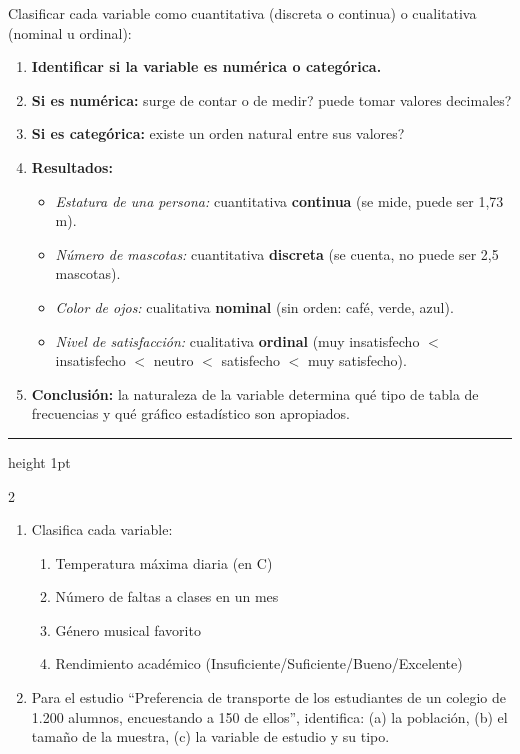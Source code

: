 \documentclass[11pt, letterpaper]{article}
\newcommand{\subbloque}[1]{%
  \vspace{14pt}
  \noindent{\large\bfseries\color{zenitnavy} #1}\par
  \vspace{4pt}\hrule height 1pt\vspace{8pt}}
\begin{document}
\begin{tcolorbox}[examplebox, title={Ej. 2. Clasificar variables}]
Clasificar cada variable como cuantitativa (discreta o continua) o cualitativa (nominal u ordinal):
\begin{enumerate}[label=\textbf{Paso \arabic*.}]
  \item \textbf{Identificar si la variable es num\'erica o categ\'orica.}

  \medskip
  \item \textbf{Si es num\'erica:} \textquestiondown surge de contar o de medir? \textquestiondown puede tomar valores decimales?

  \medskip
  \item \textbf{Si es categ\'orica:} \textquestiondown existe un orden natural entre sus valores?

  \medskip
  \item \textbf{Resultados:}
  \begin{itemize}
    \item \textit{Estatura de una persona:} cuantitativa \textbf{continua} (se mide, puede ser 1{,}73 m).
    \item \textit{N\'umero de mascotas:} cuantitativa \textbf{discreta} (se cuenta, no puede ser 2{,}5 mascotas).
    \item \textit{Color de ojos:} cualitativa \textbf{nominal} (sin orden: caf\'e, verde, azul).
    \item \textit{Nivel de satisfacci\'on:} cualitativa \textbf{ordinal} (muy insatisfecho $<$ insatisfecho $<$ neutro $<$ satisfecho $<$ muy satisfecho).
  \end{itemize}

  \medskip
  \item \textbf{Conclusi\'on:} la naturaleza de la variable determina qu\'e tipo de tabla de frecuencias y qu\'e gr\'afico estad\'istico son apropiados.
\end{enumerate}
\end{tcolorbox}

\subbloque{Pr\'actica inmediata 1}

\begin{multicols}{2}
\begin{enumerate}[label=\textbf{\arabic*.}, leftmargin=*]
  \item Clasifica cada variable:
  \begin{enumerate}[label=\alph*)]
    \item Temperatura m\'axima diaria (en \textdegree C)
    \item N\'umero de faltas a clases en un mes
    \item G\'enero musical favorito
    \item Rendimiento acad\'emico (Insuficiente/Suficiente/Bueno/Excelente)
  \end{enumerate}

  \item Para el estudio ``Preferencia de transporte de los estudiantes de un colegio de 1.200 alumnos, encuestando a 150 de ellos'', identifica: (a) la poblaci\'on, (b) el tama\~no de la muestra, (c) la variable de estudio y su tipo.
\end{enumerate}
\end{multicols}
\end{document}
